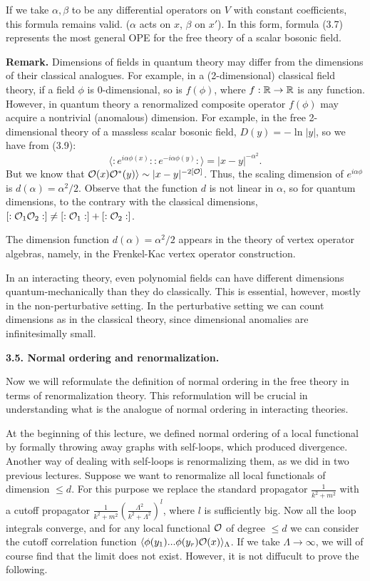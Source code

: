 \documentclass[11pt]{article}
\def\O{{\cal O}}
\def\R{\Bbb R}
\def\<{\langle}
\def\>{\rangle}
\def\L{\Lambda}
\begin{document}
If we take $\alpha,\beta$ to be any differential operators 
on $V$ with constant coefficients,
this formula remains valid. 
($\alpha$ acts on $x$, $\beta$ on $x'$). 
In this form, formula (3.7) represents the most general
OPE for the free theory of a scalar bosonic field. 

{\bf Remark.} Dimensions of fields in quantum theory may differ
from the dimensions of their classical analogues. For example, 
in a (2-dimensional) classical field theory, if a field $\phi$ is
0-dimensional, so is $f(\phi)$, where $f:\R\to\R$ is any function. 
However, in quantum theory a renormalized composite operator $f(\phi)$ 
may acquire a nontrivial (anomalous) dimension. For example, 
in the free 2-dimensional theory of a massless scalar bosonic field,
$D(y)=-\ln|y|$, so we have from (3.9):
$$
\<:e^{i\alpha\phi(x)}::e^{-i\alpha\phi(y)}:\>=|x-y|^{-\alpha^2}.
$$
But we know that $\O(x)\O^*(y)\>\sim |x-y|^{-2[\O]}$. 
Thus, the scaling dimension of $e^{i\alpha \phi}$ is $d(\alpha)=\alpha^2/2$. 
Observe that the function $d$ is not linear in $\alpha$, 
so for quantum dimensions, to the contrary with the classical dimensions,
 $[:\O_1\O_2:]\ne [:\O_1:]+[:\O_2:]$. 


The dimension function $d(\alpha)=\alpha^2/2$ 
appears in the theory of vertex operator algebras, 
namely, in the Frenkel-Kac vertex operator 
construction. 

In an interacting theory, even polynomial fields can have 
different dimensions quantum-mechanically than they do classically. 
This is essential, 
however, mostly in the non-perturbative setting. In the perturbative
setting we can count dimensions as in the classical theory, since
dimensional anomalies are infinitesimally small. 

{\bf 3.5. Normal ordering and renormalization.}

Now we will reformulate the definition of normal ordering 
in the free theory in terms of renormalization theory. 
This reformulation will be crucial in understanding 
what is the analogue of normal ordering in interacting theories. 

At the beginning of this lecture, we defined normal ordering 
of a local functional by
formally throwing away graphs with self-loops, which produced divergence. 
Another way of dealing with self-loops is renormalizing them, as we
did in two previous lectures. Suppose we want to renormalize 
all local functionals of dimension $\le d$. For this purpose
we replace the standard propagator $\frac{1}{k^2+m^2}$
with a cutoff propagator 
$\frac{1}{k^2+m^2}\left(\frac{\L^2}{k^2+\L^2}\right)^l$, where $l$ is
sufficiently big. Now all the loop integrals converge, and 
for any local functional $\O$ of degree $\le d$ we can consider
the cutoff correlation function
$\<\phi(y_1)...\phi(y_r)\O(x)\>_\L$. 
If we take $\L\to\infty$, we will of course find that the limit does not
exist. However, it is not diffucult to prove the following.
\end{document}

